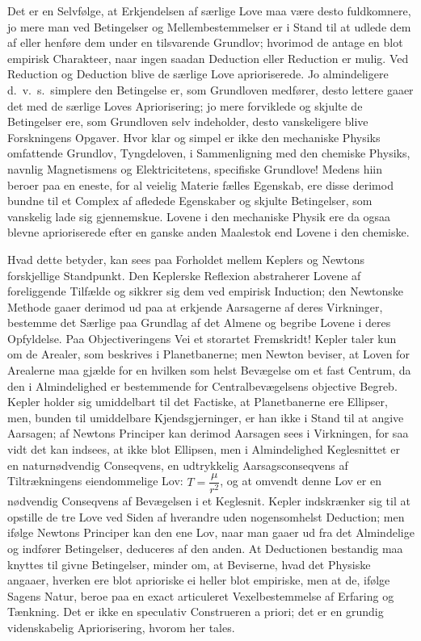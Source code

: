 \documentclass[12pt]{book}
\newcommand{\apage}[1]{\marginnote{\footnotesize\textit{[#1]}}}
\begin{document}
Det er en Selvfølge, at Erkjendelsen af særlige Love maa være desto
fuldkomnere, jo mere man ved Betingelser og Mellembestemmelser er i Stand
til at udlede dem af eller henføre dem under en tilsvarende Grundlov;
hvorimod de antage en blot empirisk Charakteer, naar ingen saadan Deduction
eller Reduction er mulig. Ved Reduction og Deduction blive de særlige Love
aprioriserede. Jo almindeligere d.\ v.\ s.\ simplere den Betingelse er, som
Grundloven medfører, desto lettere gaaer det med de særlige Loves
Apriorisering; jo mere forviklede og skjulte de Betingelser ere, som
Grundloven selv indeholder, desto vanskeligere blive Forskningens Opgaver.
Hvor klar og simpel er ikke den mechaniske Physiks omfattende Grundlov,
Tyngdeloven, i Sammenligning med den chemiske Physiks, navnlig
Magnetismens og Elektricitetens, specifiske Grundlove! Medens hiin beroer
paa en eneste, for al veielig Materie fælles Egenskab, ere disse derimod
bundne til et Complex af afledede Egenskaber og skjulte Betingelser, som
vanskelig lade sig gjennemskue. Lovene i den mechaniske Physik ere da ogsaa
blevne aprioriserede efter en ganske anden Maalestok end Lovene i den
chemiske.

\apage{145} Hvad dette betyder, kan sees paa Forholdet mellem Keplers og Newtons
forskjellige Standpunkt. Den Keplerske Reflexion abstraherer Lovene af
foreliggende Tilfælde og sikkrer sig dem ved empirisk Induction; den
Newtonske Methode gaaer derimod ud paa at erkjende Aarsagerne af deres
Virkninger, bestemme det Særlige paa Grundlag af det Almene og begribe
Lovene i deres Opfyldelse. Paa Objectiveringens Vei et storartet Fremskridt!
Kepler taler kun om de Arealer, som beskrives i Planetbanerne; men Newton
beviser, at Loven for Arealerne maa gjælde for en hvilken som helst
Bevægelse om et fast Centrum, da den i Almindelighed er bestemmende for
Centralbevægelsens objective Begreb. Kepler holder sig umiddelbart til det
Factiske, at Planetbanerne ere Ellipser, men, bunden til umiddelbare
Kjendsgjerninger, er han ikke i Stand til at angive Aarsagen; af Newtons
Principer kan derimod Aarsagen sees i Virkningen, for saa vidt det kan
indsees, at ikke blot Ellipsen, men i Almindelighed Keglesnittet er en
naturnødvendig Conseqvens, en udtrykkelig Aarsagsconseqvens af
Tiltrækningens eiendommelige Lov: $T = \dfrac{\mu}{r^2}$, og at omvendt denne
Lov er en nødvendig Conseqvens af Bevægelsen i et Keglesnit. Kepler
indskrænker sig til at opstille de tre Love ved Siden af hverandre uden
nogensomhelst Deduction; men ifølge Newtons Principer kan den ene Lov, naar
man gaaer ud fra det Almindelige og indfører Betingelser, deduceres af den
anden. At Deductionen bestandig maa knyttes til givne Betingelser, minder
om, \apage{146} at Beviserne, hvad det Physiske angaaer, hverken ere blot aprioriske ei
heller blot empiriske, men at de, ifølge Sagens Natur, beroe paa en exact
articuleret Vexelbestemmelse af Erfaring og Tænkning. Det er ikke en
speculativ Construeren a priori; det er en grundig videnskabelig
Apriorisering, hvorom her tales.
\end{document}
